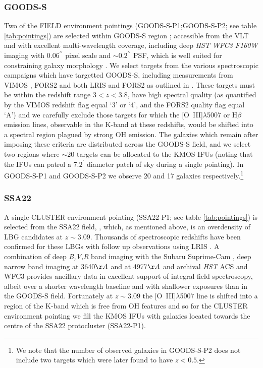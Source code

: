 \documentclass[fleqn,usenatbib]{mn2e}
\begin{document}
\subsubsection{GOODS-S}\label{subsubsec:sample_selection_goods}
Two of the FIELD environment pointings (GOODS-S-P1;GOODS-S-P2; see table \ref{tab:pointings}) are selected within GOODS-S region \citep{Guo2013}; accessible from the VLT and with excellent multi-wavelength coverage, including deep {\em HST WFC3 F160W} imaging with $ 0.06^{\prime\prime}$ pixel scale and $ \sim 0.2^{\prime\prime}$ PSF, which is well suited for constraining galaxy morphology \citep{Grogin2011,Koekemoer2011}.
We select targets from the various spectroscopic campaigns which have targetted GOODS-S, including measurements from VIMOS \citep{Balestra2010,Cassata2014}, FORS2 \citep{Vanzella2005,Vanzella2006,Vanzella2008} and both LRIS and FORS2 as outlined in \cite{Wuyts2009}.
These targets must be within the redshift range $3 < z < 3.8$, have high spectral quality (as quantified by the VIMOS redshift flag equal `3' or `4', and the FORS2 quality flag equal `A') and we carefully exclude those targets for which the [O~{\sc III}]$\lambda$5007 or H$\beta$ emission lines, observable in the K-band at these redshifts, would be shifted into a spectral region plagued by strong OH emission.
The galaxies which remain after imposing these criteria are distributed across the GOODS-S field, and we select two regions where $\sim 20$ targets can be allocated to the KMOS IFUs (noting that the IFUs can patrol a $7.2^{\prime}$ diameter patch of sky during a single pointing).
In GOODS-S-P1 and GOODS-S-P2 we observe 20 and 17 galaxies respectively.\footnote{We note that the number of observed galaxies in GOODS-S-P2 does not include two targets which were later found to have $z < 0.5$.}

\subsubsection{SSA22}\label{subsubsec:sample_selection_ssa}
A single CLUSTER environment pointing (SSA22-P1; see table \ref{tab:pointings}) is selected from the SSA22 field, \citep{Steidel1998,Steidel2000,Steidel2003,Shapley2003}, which, as mentioned above, is an overdensity of LBG candidates at $z \sim 3.09$.
Thousands of spectroscopic redshifts have been confirmed for these LBGs with follow up observations using LRIS \citep{Shapley2003,Nestor2013}.
A combination of deep {\em B,V,R} band imaging with the Subaru Suprime-Cam \citep{Matsuda2004}, deep narrow band imaging at 3640$\AA$ \citep{Matsuda2004} and at 4977$\AA$ \citep{Nestor2011} and archival {\em HST} ACS and WFC3 provides ancillary data in excellent support of integral field spectroscopy, albeit over a shorter wavelength baseline and with shallower exposures than in the GOODS-S field.
Fortunately at $z \sim 3.09$ the [O~{\sc III}]$\lambda$5007 line is shifted into a region of the K-band which is free from OH features and so for the CLUSTER environment pointing we fill the KMOS IFUs with galaxies located towards the centre of the SSA22 protocluster (SSA22-P1).
\end{document}
